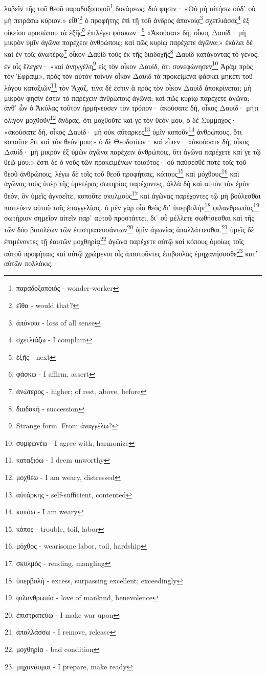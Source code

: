 λαβεῖν
τῆς
τοῦ
θεοῦ
παραδοξοποιοῦ\footnote{παραδοξοποιός - wonder-worker}
δυνάμεως.
διό
φησιν·
«Οὐ
μὴ
αἰτήσω
οὐδ᾽
οὐ
μὴ
πειράσω
κύριον.»
εἶθ᾽\footnote{εἴθα - would that?}
ὁ
προφήτης
ἐπὶ
τῇ
τοῦ
ἀνδρὸς
ἀπονοίᾳ\footnote{ἀπόνοια - loss of all sense}
σχετλιάσας\footnote{σχετλιάζω - I complain}
ἐξ
οἰκείου
προσώπου
τὰ
ἑξῆς\footnote{ἑξῆς - next}
ἐπιλέγει
φάσκων·\footnote{φάσκω - I affirm, assert}
«Ἀκούσατε
δή,
οἶκος
Δαυίδ·
μὴ
μικρὸν
ὑμῖν
ἀγῶνα
παρέχειν
ἀνθρώποις;
καὶ
πῶς
κυρίῳ
παρέχετε
ἀγῶνα;»
ἐκάλει
δὲ
καὶ
ἐν
τοῖς
ἀνωτέρῳ\footnote{ἀνώτερος - higher; of rest, above, before}
οἶκον
Δαυὶδ
τοὺς
ἐκ
τῆς
διαδοχῆς\footnote{διαδοκή - succession}
Δαυὶδ
κατάγοντας
τὸ
γένος,
ἐν
οἷς
ἔλεγεν·
«καὶ
ἀνηγγέλη\footnote{Strange form. From ἀναγγέλω?}
εἰς
τὸν
οἶκον
Δαυίδ,
ὅτι
συνεφώνησεν\footnote{συμφωνέω - I agree with, harmonize}
Ἀρὰμ
πρὸς
τὸν
Ἐφραίμ»,
πρὸς
τὸν
αὐτὸν
τοίνυν
οἶκον
Δαυὶδ
τὰ
προκείμενα
φάσκει
μηκέτι
τοῦ
λόγου
καταξιῶν\footnote{καταξιόω - I deem unworthy}
τὸν
Ἄχαζ.
τίνα
δέ
ἐστιν
ἃ
πρὸς
τὸν
οἶκον
Δαυὶδ
ἀποκρίνεται;
μὴ
μικρόν φησίν
ἐστιν
τὸ
παρέχειν
ἀνθρώποις
ἀγῶνα;
καὶ
πῶς
κυρίῳ
παρέχετε
ἀγῶνα;
ἀνθ᾽
ὧν
ὁ
Ἀκύλας
τοῦτον
ἡρμήνευσεν
τὸν
τρόπον·
ἀκούσατε
δή,
οἶκος
Δαυίδ·
μήτι
ὀλίγον
μοχθοῦν\footnote{μοχθέω - I am weary, distressed}
ἄνδρας,
ὅτι
μοχθοῦτε
καί
γε
τὸν
θεόν
μου;
ὁ
δὲ
Σύμμαχος·
«ἀκούσατε
δή,
οἶκος
Δαυίδ·
μὴ
οὐκ
αὔταρκες\footnote{αὐτάρκης - self-sufficient, contented}
ὑμῖν
κοποῦν\footnote{κοπόω - I am weary}
ἀνθρώπους,
ὅτι
κοποῦτε ἔτι
καὶ
τὸν
θεόν
μου;»
ὁ
δὲ
Θεοδοτίων·
καὶ
εἶπεν·
«ἀκούσατε
δή,
οἶκος
Δαυίδ·
μὴ μικρὸν
ἐξ
ὑμῶν
ἀγῶνα
παρέχειν
ἀνθρώποις,
ὅτι
ἀγῶνα
παρέχετε
καί
γε
τῷ
θεῷ
μου;»
ἔστι
δὲ
ὁ
νοῦς
τῶν
προκειμένων
τοιοῦτος·
οὐ
παύσεσθέ
ποτε
τοῖς
τοῦ
θεοῦ ἀνθρώποις,
λέγω
δὲ
τοῖς
τοῦ
θεοῦ
προφήταις,
κόπους\footnote{κόπος - trouble, toil, labor}
καὶ
μόχθους\footnote{μόχθος - wearisome labor, toil, hardship}
καὶ
ἀγῶνας
τοὺς
ὑπὲρ
τῆς
ὑμετέρας
σωτηρίας
παρέχοντες,
ἀλλὰ
δὴ
καὶ
αὐτὸν
τὸν
ἐμὸν
θεόν,
ὃν
ὑμεῖς
ἀγνοεῖτε,
κοποῦτε
σκυλμοὺς\footnote{σκυλμός - rending, mangling}
καὶ
ἀγῶνας
παρέχοντες
τῷ
μὴ
βούλεσθαι
πιστεύειν
αὐτοῦ
ταῖς
ἐπαγγελίαις.
ὁ
μὲν
γὰρ
οἷα
θεὸς
δι᾽
ὑπερβολὴν\footnote{ὑπερβολή - excess, surpassing excellent; exceedingly}
φιλανθρωπίας\footnote{φιλανθρωπία - love of mankind, benevolence}
σωτήριον
σημεῖον
αἰτεῖν
παρ᾽
αὐτοῦ
προστάττει,
δι᾽
οὗ
μέλλετε
σωθήσεσθαι
καὶ
τῆς
τῶν
δύο
βασιλέων
τῶν
ἐπιστρατευσάντων\footnote{ἐπιστρατεύω - I make war upon}
ὑμῖν
ἀγωνίας
ἀπαλλάττεσθαι.\footnote{ἀπαλλάσσω - I remove, release}
ὑμεῖς
δὲ
ἐπιμένοντες
τῇ
ἑαυτῶν
μοχθηρίᾳ\footnote{μοχθηρία - bad condition}
ἀγῶνα
παρέχετε
αὐτῷ
καὶ
κόπους
ὁμοίως
τοῖς αὐτοῦ
προφήταις
καὶ
αὐτῷ
χρώμενοι
οἷς
ἀπιστοῦντες
ἐπιβουλὰς
ἐμηχανήσασθε\footnote{μηχανάομαι - I prepare, make ready}
κατ᾽
αὐτῶν
πολλάκις. 

